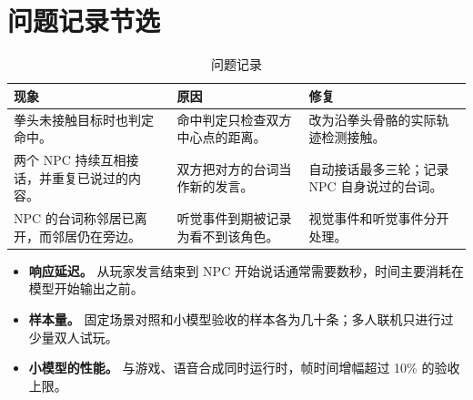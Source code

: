 \documentclass[11pt]{article}
\begin{document}
\section{问题记录节选}

\begin{table}[H]
\small
\begin{tabularx}{\textwidth}{@{}L L L@{}}
\toprule
\textbf{现象} & \textbf{原因} & \textbf{修复} \\
\midrule
拳头未接触目标时也判定命中。 & 命中判定只检查双方中心点的距离。 & 改为沿拳头骨骼的实际轨迹检测接触。 \\
两个 NPC 持续互相接话，并重复已说过的内容。 & 双方把对方的台词当作新的发言。 & 自动接话最多三轮；记录 NPC 自身说过的台词。 \\
NPC 的台词称邻居已离开，而邻居仍在旁边。 & 听觉事件到期被记录为看不到该角色。 & 视觉事件和听觉事件分开处理。 \\
\bottomrule
\end{tabularx}
\caption{问题记录}
\end{table}


\need{2.3cm}

{\small
\begin{itemize}\setlength{\itemsep}{0pt}\setlength{\parskip}{0pt}
  \item \textbf{响应延迟。} 从玩家发言结束到 NPC 开始说话通常需要数秒，时间主要消耗在模型开始输出之前。
  \item \textbf{样本量。} 固定场景对照和小模型验收的样本各为几十条；多人联机只进行过少量双人试玩。
  \item \textbf{小模型的性能。} 与游戏、语音合成同时运行时，帧时间增幅超过 10\% 的验收上限。
\end{itemize}
}
\end{document}
